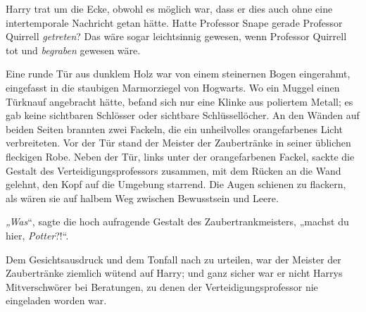 Harry trat um die Ecke, obwohl es möglich war, dass er dies auch ohne eine intertemporale Nachricht getan hätte. Hatte Professor Snape gerade Professor Quirrell \emph{getreten}? Das wäre sogar leichtsinnig gewesen, wenn Professor Quirrell tot und \emph{begraben} gewesen wäre.

Eine runde Tür aus dunklem Holz war von einem steinernen Bogen eingerahmt, eingefasst in die staubigen Marmorziegel von Hogwarts. Wo ein Muggel einen Türknauf angebracht hätte, befand sich nur eine Klinke aus poliertem Metall; es gab keine sichtbaren Schlösser oder sichtbare Schlüssellöcher. An den Wänden auf beiden Seiten brannten zwei Fackeln, die ein unheilvolles orangefarbenes Licht verbreiteten. Vor der Tür stand der Meister der Zaubertränke in seiner üblichen fleckigen Robe. Neben der Tür, links unter der orangefarbenen Fackel, sackte die Gestalt des Verteidigungsprofessors zusammen, mit dem Rücken an die Wand gelehnt, den Kopf auf die Umgebung starrend. Die Augen schienen zu flackern, als wären sie auf halbem Weg zwischen Bewusstsein und Leere.

\emph{„Was}“, sagte die hoch aufragende Gestalt des Zaubertrankmeisters, „machst du hier, \emph{Potter}?!“.

Dem Gesichtsausdruck und dem Tonfall nach zu urteilen, war der Meister der Zaubertränke ziemlich wütend auf Harry; und ganz sicher war er nicht Harrys Mitverschwörer bei Beratungen, zu denen der Verteidigungsprofessor nie eingeladen worden war.

